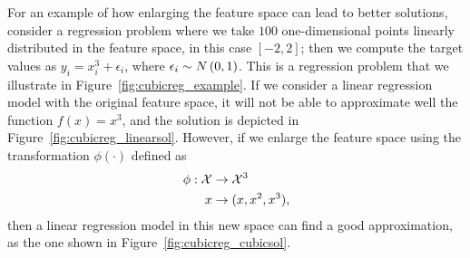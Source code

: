 For an example of how enlarging the feature space can lead to better solutions, consider a regression problem where we take $100$ one-dimensional points linearly distributed in the feature space, in this case $[-2, 2]$; then we compute the target values as $y_i = x_i^3 + \epsilon_i$, where $\epsilon_i \sim N \left(0, 1\right)$. This is a regression problem that we illustrate in Figure~\ref{fig:cubicreg_example}. If we consider a linear regression model with the original feature space, it will not be able to approximate well the function $f(x)=x^3$, and the solution is depicted in Figure~\ref{fig:cubicreg_linearsol}.
However, if we enlarge the feature space using the transformation $\phi(\cdot)$ defined as
\begin{equation}
    \begin{aligned}
        \nonumber
        \phi:\mathcal{X} &\to\mathcal{X}^3 \\
        x &\to (x, x^2, x^3) ,
    \end{aligned}
\end{equation}
then a linear regression model in this new space can find a good approximation, as the one shown in Figure~\ref{fig:cubicreg_cubicsol}.
%

